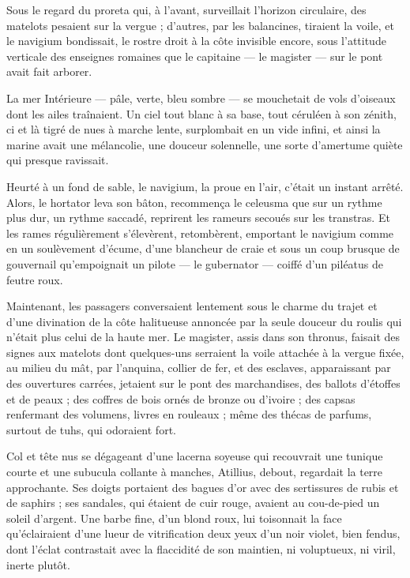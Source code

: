 \documentclass[a4paper, 11pt, oneside, polutonikogreek, french]{article}
\begin{document}
Sous le regard du proreta qui, à l'avant, surveillait l'horizon circulaire, des matelots pesaient sur la vergue ; d'autres, par les balancines, tiraient la voile, et le navigium bondissait, le rostre droit à la côte invisible encore, sous l'attitude verticale des enseignes romaines que le capitaine --- le magister --- sur le pont avait fait arborer.

La mer Intérieure --- pâle, verte, bleu sombre --- se mouchetait de vols d'oiseaux dont les ailes traînaient. Un ciel tout blanc à sa base, tout céruléen à son zénith, ci et là tigré de nues à marche lente, surplombait en un vide infini, et ainsi la marine avait une mélancolie, une douceur solennelle, une sorte d'amertume quiète qui presque ravissait.

Heurté à un fond de sable, le navigium, la proue en l'air, c’était un instant arrêté. Alors, le hortator leva son bâton, recommença le celeusma que sur un rythme plus dur, un rythme saccadé, reprirent les rameurs secoués sur les transtras. Et les rames régulièrement s'élevèrent, retombèrent, emportant le navigium comme en un soulèvement d'écume, d'une blancheur de craie et sous un coup brusque de gouvernail qu'empoignait un pilote --- le gubernator --- coiffé d'un piléatus de feutre roux.

Maintenant, les passagers conversaient lentement sous le charme du trajet et d'une divination de la côte halitueuse annoncée par la seule douceur du roulis qui n'était plus celui de la haute mer. Le magister, assis dans son thronus, faisait des signes aux matelots dont quelques-uns serraient la voile attachée à la vergue fixée, au milieu du mât, par l'anquina, collier de fer, et des esclaves, apparaissant par des ouvertures carrées, jetaient sur le pont des marchandises, des ballots d'étoffes et de peaux ; des coffres de bois ornés de bronze ou d'ivoire ; des capsas renfermant des volumens, livres en rouleaux ; même des thécas de parfums, surtout de tuhs, qui odoraient fort.

Col et tête nus se dégageant d'une lacerna soyeuse qui recouvrait une tunique courte et une subucula collante à manches, Atillius, debout, regardait la terre approchante. Ses doigts portaient des bagues d'or avec des sertissures de rubis et de saphirs ; ses sandales, qui étaient de cuir rouge, avaient au cou-de-pied un soleil d'argent. Une barbe fine, d'un blond roux, lui toisonnait la face qu'éclairaient d'une lueur de vitrification deux yeux d'un noir violet, bien fendus, dont l'éclat contrastait avec la flaccidité de son maintien, ni voluptueux, ni viril, inerte plutôt.
\end{document}
